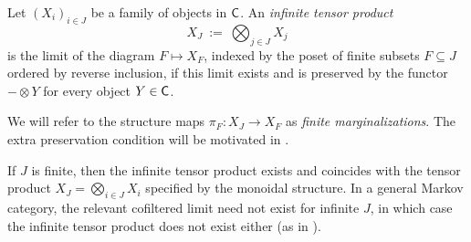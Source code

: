 \documentclass[11pt]{article}
\begin{document}
\begin{definition}
	\label{semicartesian_infproduct}
	Let $(X_i)_{i \in J}$ be a family of objects in $\mathsf{C}$. An \emph{infinite tensor product}
	\[
		X_J \: := \: \bigotimes_{j \in J} X_j
	\]
	is the limit of the diagram $F \mapsto X_F$, indexed by the poset of finite subsets $F \subseteq J$ ordered by reverse inclusion, if this limit exists and is preserved by the functor $- \otimes Y$ for every object $Y \in \mathsf{C}$.
\end{definition}

We will refer to the structure maps $\pi_F : X_J \to X_F$ as \emph{finite marginalizations}. The extra preservation condition will be motivated in .

\begin{remark}
	If $J$ is finite, then the infinite tensor product exists and coincides with the tensor product $X_J = \bigotimes_{i \in J} X_i$ specified by the monoidal structure. In a general Markov category, the relevant cofiltered limit need not exist for infinite $J$, in which case the infinite tensor product does not exist either (as in ).
\end{remark}
\end{document}
